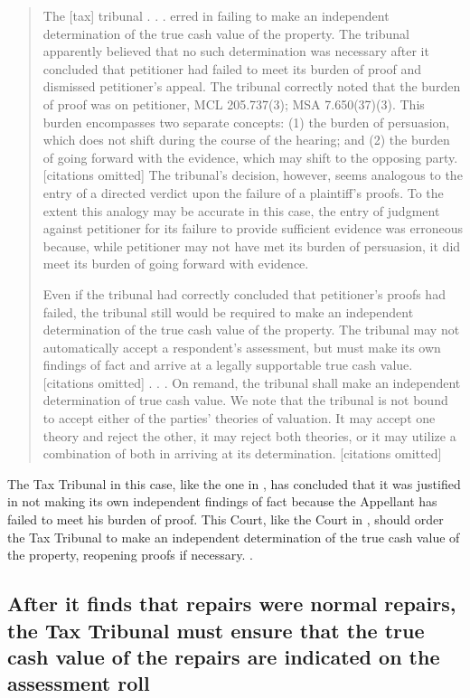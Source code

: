 \documentclass[12pt,\documentclassflag]{michiganCourtOfAppealsBrief}
\begin{document}
\begin{quotation}
	The [tax] tribunal . . . erred in failing to make an independent determination of the true cash value of the property. The tribunal apparently believed that no such determination was necessary after it concluded that petitioner had failed to meet its burden of proof and dismissed petitioner's appeal. The tribunal correctly noted that the burden of proof was on petitioner, MCL 205.737(3); MSA 7.650(37)(3). This burden encompasses two separate concepts: (1) the burden of persuasion, which does not shift during the course of the hearing; and (2) the burden of going forward with the evidence, which may shift to the opposing party. [citations omitted] The tribunal's decision, however, seems analogous to the entry of a directed verdict upon the failure of a plaintiff's proofs. To the extent this analogy may be accurate in this case, the entry of judgment against petitioner for its failure to provide sufficient evidence was erroneous because, while petitioner may not have met its burden of persuasion, it did meet its burden of going forward with evidence.
	
	Even if the tribunal had correctly concluded that petitioner's proofs had failed, the tribunal still would be required to make an independent determination of the true cash value of the property. The tribunal may not automatically accept a respondent's assessment, but must make its own findings of fact and arrive at a legally supportable true cash value. [citations omitted] . . . On remand, the tribunal shall make an independent determination of true cash value. We note that the tribunal is not bound to accept either of the parties' theories of valuation. It may accept one theory and reject the other, it may reject both theories, or it may utilize a combination of both in arriving at its determination. [citations omitted]
\end{quotation}

The Tax Tribunal in this case, like the one in \cite[s]{Jones & Laughlin}, has concluded that it was justified in not making its own independent findings of fact because the Appellant has failed to meet his burden of proof. This Court, like the Court in \cite[s]{Jones & Laughlin}, should order the Tax Tribunal to make an independent determination of the true cash value of the property, reopening proofs if necessary. .

\subsection{After it finds that repairs were normal repairs, the Tax Tribunal must ensure that the true cash value of the repairs are indicated on the assessment roll}
\end{document}
